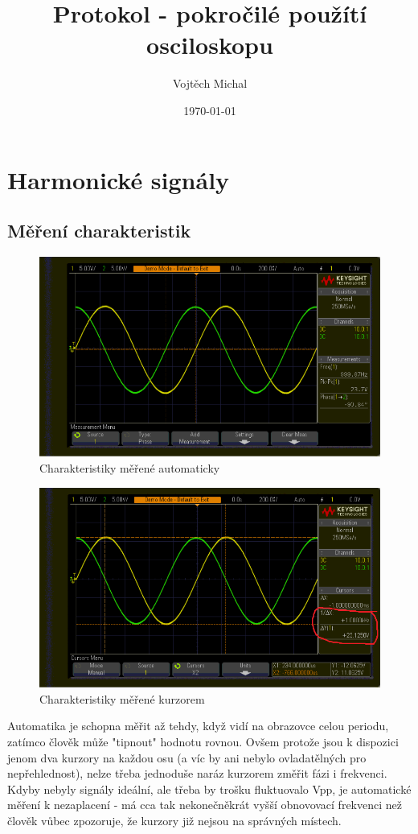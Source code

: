 \documentclass[twoside]{article}
\title{Protokol - pokročilé použítí osciloskopu}
\author{Vojtěch Michal}
\date{\today}
\begin{document}
\maketitle

\section{Harmonické signály}

\subsection{Měření charakteristik}
\begin{figure}[htbp]
	\centering
	\includegraphics[width=.6\linewidth]{sinus_frek_pp_automatika.png}
\caption{Charakteristiky měřené automaticky}
\end{figure}

\begin{figure}[htbp]
	\centering
	\includegraphics[width=.6\linewidth]{sinus_frek_pp_kurzor.png              }
	\caption{Charakteristiky měřené kurzorem}
\end{figure}

Automatika je schopna měřit až tehdy, když vidí na obrazovce celou periodu,
zatímco člověk může "tipnout" hodnotu rovnou. Ovšem protože jsou k dispozici jenom dva kurzory na každou osu
(a víc by ani nebylo ovladatělných pro nepřehlednost), nelze třeba jednoduše naráz kurzorem změřit fázi i frekvenci.
Kdyby nebyly signály ideální, ale třeba by trošku fluktuovalo Vpp, je automatické měření k nezaplacení - má cca tak
nekonečněkrát vyšší obnovovací frekvenci než člověk vůbec zpozoruje, že kurzory již nejsou na správných místech.
\end{document}
